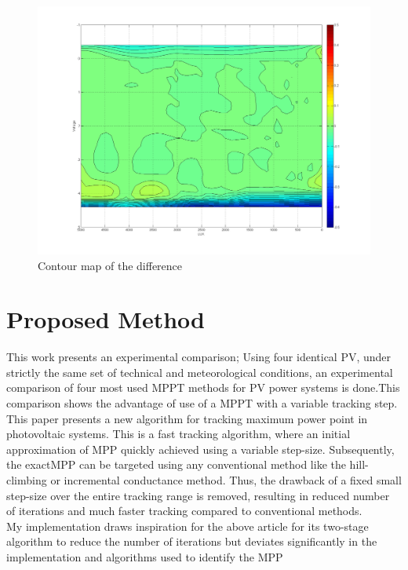 \begin{figure}[H]
  \begin{center}
	  \includegraphics[width=\textwidth]{images/Contour_map}
	  \caption{Contour map of the difference}
	  \label{fig:Contour_map}
  \end{center}
\end{figure}

\section{Proposed Method }

\cite{houssamo2013experimental}

This work presents an experimental comparison; Using four identical PV, under strictly the same set of technical and meteorological conditions, an experimental comparison  of four most used MPPT methods for PV power systems is done.This comparison shows the advantage of use of a MPPT with a variable tracking step.\\  

\cite{jain2004new}
This paper presents a new algorithm for tracking maximum power point in photovoltaic systems. This is a fast tracking algorithm, where an initial approximation of \ac{MPP} quickly achieved using a variable step-size. Subsequently, the exact\ac{MPP} can be targeted using any conventional method like the hill-climbing or incremental conductance method. Thus, the drawback of a fixed small step-size over the entire tracking range is removed, resulting in reduced number of iterations and much faster tracking compared to conventional methods. \\
 My implementation draws inspiration for the above article for its  two-stage algorithm to reduce the number of iterations but deviates significantly in the implementation and algorithms used to identify the \ac{MPP} 
 
